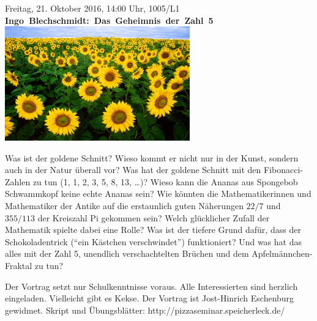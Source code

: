 \documentclass[a4paper,ngerman,landscape]{scrartcl}
\begin{document}
\begin{center}
  \Huge
  \vspace*{0.0em}
  Freitag, 21. Oktober 2016, 14:00 Uhr, 1005/L1 \\
  \mbox{\textbf{Ingo Blechschmidt: Das Geheimnis der Zahl 5}}
  \vfill
  \vspace{0.3em}
  \includegraphics[width=0.6\textwidth]{sonnenblumen}
  \vfill

  \Large
  \begin{minipage}{0.92\textwidth}
    \setlength\parskip{\medskipamount}
    \vspace{0.3em}
    Was ist der goldene Schnitt? Wieso kommt er nicht nur in der Kunst, sondern
    auch in der Natur überall vor? Was hat der goldene Schnitt mit den
    Fibonacci-Zahlen zu tun (1, 1, 2, 3, 5, 8, 13, \ldots)? Wieso kann die Ananas
    aus Spongebob Schwammkopf keine echte Ananas sein? Wie könnten die
    Mathematikerinnen und Mathematiker der Antike auf die erstaunlich guten
    Näherungen $22/7$ und $355/113$ der Kreiszahl Pi gekommen sein? Welch
    glücklicher Zufall der Mathematik spielte dabei eine Rolle? Was ist der
    tiefere Grund dafür, dass der Schokoladentrick ("`ein Kästchen
    verschwindet"') funktioniert? Und was hat das alles mit der Zahl 5,
    unendlich verschachtelten Brüchen und dem Apfelmännchen-Fraktal zu tun?

    Der Vortrag setzt nur Schulkenntnisse voraus. Alle Interessierten sind
    herzlich eingeladen. Vielleicht gibt es Kekse. Der Vortrag ist Jost-Hinrich
    Eschenburg gewidmet.
    \vspace{0.3em}
    \hfill\small Skript und Übungsblätter: \textsf{http:/$\!$/pizzaseminar.speicherleck.de/}
  \end{minipage}
\end{center}
\end{document}

